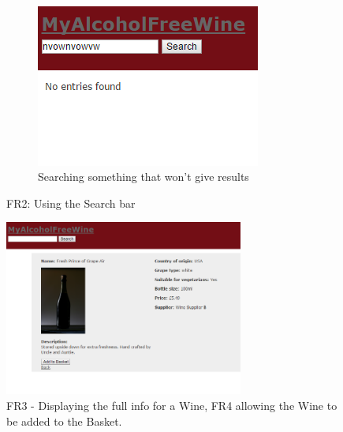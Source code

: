 \documentclass[12pt]{article}
\begin{document}
\begin{figure}[H]
    ~ %
    \begin{subfigure}[b]{0.3\textwidth}
        \includegraphics[width=\textwidth]{assets/FR2_screen_3}
        \caption{Searching something that won't give results}
        \label{fig:FR2 nonsense}
    \end{subfigure}
    \caption{FR2: Using the Search bar}\label{fig:FR2 Search}
\end{figure}

\begin{figure}[H]
        \centering
                \includegraphics[width=0.7\textwidth]{assets/FR3_screen}
                \caption{FR3 - Displaying the full info for a Wine, FR4 allowing the Wine to be added to the Basket.}
                \label{fig: FR3_1.} 
\end{figure}
\end{document}
